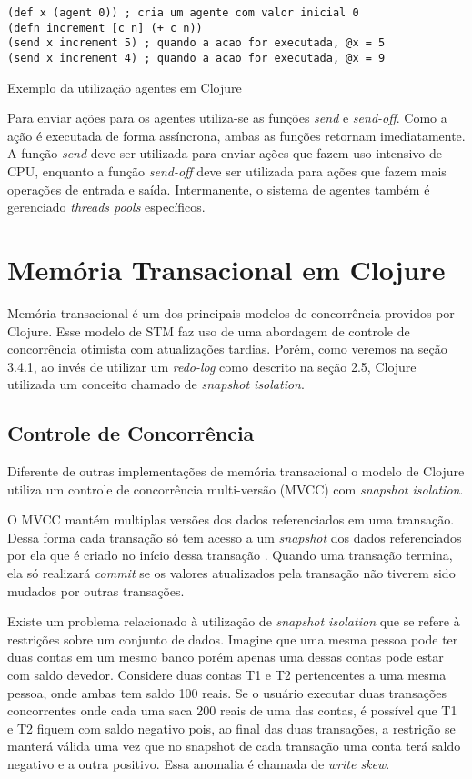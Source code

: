\begin{listing}
  \begin{verbatim}
(def x (agent 0)) ; cria um agente com valor inicial 0
(defn increment [c n] (+ c n))
(send x increment 5) ; quando a acao for executada, @x = 5
(send x increment 4) ; quando a acao for executada, @x = 9
  \end{verbatim}
  \caption{Exemplo da utilização agentes em Clojure}
\end{listing}

Para enviar ações para os agentes utiliza-se as funções \emph{send} e \emph{send-off}. Como a ação é executada de forma assíncrona, ambas as funções retornam imediatamente. A função \emph{send} deve ser utilizada para enviar ações que fazem uso intensivo de CPU, enquanto a função \emph{send-off} deve ser utilizada para ações que fazem mais operações de entrada e saída. Intermanente, o sistema de agentes também é gerenciado \emph{threads pools} específicos.


\section{Memória Transacional em Clojure}

Memória transacional é um dos principais modelos de concorrência providos por Clojure. Esse modelo de STM faz uso de uma abordagem de controle de concorrência otimista com atualizações tardias. Porém, como veremos na seção 3.4.1, ao invés de utilizar um \emph{redo-log} como descrito na seção 2.5, Clojure utilizada um conceito chamado de \emph{snapshot isolation}.


\subsection{Controle de Concorrência}

Diferente de outras implementações de memória transacional o modelo de Clojure utiliza um controle de concorrência multi-versão (MVCC) com \emph{snapshot isolation}. \cite{hickey2010clojurerefs}

O MVCC mantém multiplas versões dos dados referenciados em uma transação. Dessa forma cada transação só tem acesso a um \emph{snapshot} dos dados referenciados por ela que é criado no início dessa transação \cite{swinnerton2012clojure}. Quando uma transação termina, ela só realizará \emph{commit} se os valores atualizados pela transação não tiverem sido mudados por outras transações. 

Existe um problema relacionado à utilização de \emph{snapshot isolation} que se refere à restrições sobre um conjunto de dados. Imagine que uma mesma pessoa pode ter duas contas em um mesmo banco porém apenas uma dessas contas pode estar com saldo devedor. Considere duas contas T1 e T2 pertencentes a uma mesma pessoa, onde ambas tem saldo 100 reais. Se o usuário executar duas transações concorrentes onde cada uma saca 200 reais de uma das contas, é possível que T1 e T2 fiquem com saldo negativo pois, ao final das duas transações, a restrição se manterá válida uma vez que no snapshot de cada transação uma conta terá saldo negativo e a outra positivo. \cite{wiki2013snapshot} Essa anomalia é chamada de \emph{write skew}.

